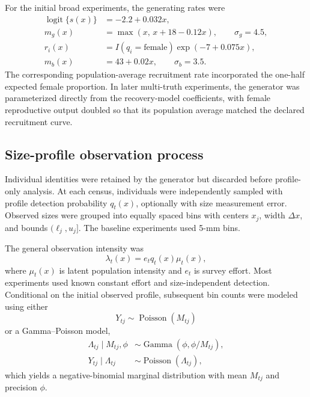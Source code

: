 \documentclass[11pt]{article}
\begin{document}
For the initial broad experiments, the generating rates were
\begin{align}
  \operatorname{logit}\{s(x)\} &= -2.2 + 0.032x,\\
  m_g(x) &= \max(x,\,x+18-0.12x), \qquad \sigma_g=4.5,\\
  r_i(x) &= I(q_i=\mathrm{female})\exp(-7+0.075x),\\
  m_b(x) &= 43+0.02x, \qquad \sigma_b=3.5.
\end{align}
The corresponding population-average recruitment rate incorporated the
one-half expected female proportion. In later multi-truth experiments, the
generator was parameterized directly from the recovery-model coefficients,
with female reproductive output doubled so that its population average
matched the declared recruitment curve.

\subsection{Size-profile observation process}

Individual identities were retained by the generator but discarded before
profile-only analysis. At each census, individuals were independently sampled
with profile detection probability \(q_t(x)\), optionally with size
measurement error. Observed sizes were grouped into equally spaced bins with
centers \(x_j\), width \(\Delta x\), and bounds
\((\ell_j,u_j]\). The baseline experiments used 5-mm bins.

The general observation intensity was
\begin{equation}
  \lambda_t(x)=e_tq_t(x)\mu_t(x),
\end{equation}
where \(\mu_t(x)\) is latent population intensity and \(e_t\) is survey effort.
Most experiments used known constant effort and size-independent detection.
Conditional on the initial observed profile, subsequent bin counts were
modeled using either
\begin{equation}
  Y_{tj}\sim\operatorname{Poisson}(M_{tj})
\end{equation}
or a Gamma--Poisson model,
\begin{align}
  \Lambda_{tj}\mid M_{tj},\phi
    &\sim\operatorname{Gamma}(\phi,\phi/M_{tj}),\\
  Y_{tj}\mid\Lambda_{tj}
    &\sim\operatorname{Poisson}(\Lambda_{tj}),
\end{align}
which yields a negative-binomial marginal distribution with mean \(M_{tj}\)
and precision \(\phi\).
\end{document}
